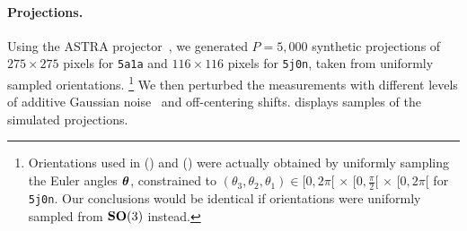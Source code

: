 \paragraph{Projections.}
Using the ASTRA projector~\cite{van2015astra}, we generated $P=5,000$ synthetic projections of $275 \times 275$ pixels for \texttt{5a1a} and $116 \times 116$ pixels for \texttt{5j0n}, taken from uniformly sampled orientations.%
\footnote{Orientations used in  () and  () were actually obtained by uniformly sampling the Euler angles ${\boldsymbol{\theta}}$, constrained to $(\theta_3,\theta_2,\theta_1) \in [0, 2\pi[ \, \times \, [0, \frac{\pi}{2}[ \, \times \, [0, 2\pi[$ for \texttt{5j0n}. Our conclusions would be identical if orientations were uniformly sampled from $\mathrm{\mathbf{SO}}(3)$ instead.}
We then perturbed the measurements with different levels of additive Gaussian noise~\cite{sorzano2004normalizing,shigematsu2013noise} and off-centering shifts. %
 displays samples of the simulated projections.

